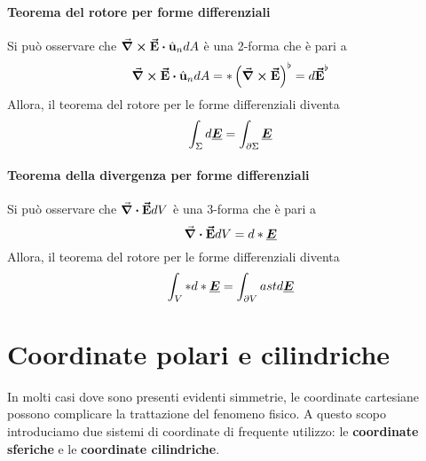 \paragraph{Teorema del rotore per forme differenziali}
Si può osservare che $\curl{\vba{E}}\vdot \vbh{u}_n dA$ è una 2-forma che è pari a
\begin{equation*}
	\curl{\vba{E}}\vdot \vbh{u}_n dA=\ast\left(\curl{\vba{E}}\right)^\flat=d\vba{E}^\flat
\end{equation*}%
Allora, il teorema del rotore per le forme differenziali diventa
\begin{equation}
	\int_\Sigma d\vb*{\underline{E}}=\int_{\partial \Sigma}\vb*{\underline{E}}
\end{equation}
\paragraph{Teorema della divergenza per forme differenziali}
Si può osservare che $\div{\vb*{\va{E}}}dV$ è una 3-forma che è pari a
\begin{equation*}
	\div{\vb*{\va{E}}}dV=d\ast\vb*{\underline{E}}
\end{equation*}%
Allora, il teorema del rotore per le forme differenziali diventa
\begin{equation}
	\int_V \ast d\ast\vb*{\underline{E}}=\int_{\partial V}ast d\vb*{\underline{E}}
\end{equation}
\section{Coordinate polari e cilindriche}
In molti casi dove sono presenti evidenti simmetrie, le coordinate cartesiane possono complicare la trattazione del fenomeno fisico. A questo scopo introduciamo due sistemi di coordinate di frequente utilizzo: le \textbf{coordinate sferiche} e le \textbf{coordinate cilindriche}.

